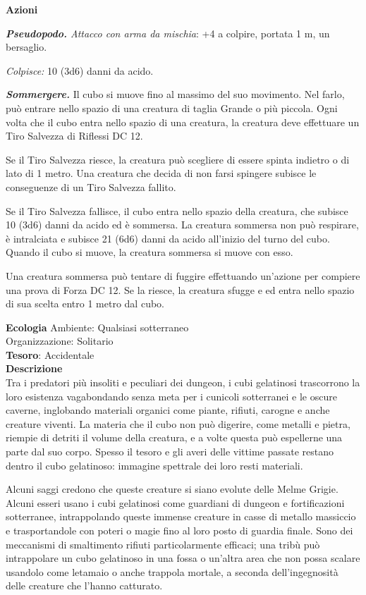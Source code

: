 \begin{multicols}{2}
\textbf{Azioni}

\textit{\textbf{Pseudopodo.} Attacco con arma da mischia}: +4 a colpire, portata 1 m, un bersaglio.

\textit{Colpisce:} 10 (3d6) danni da acido.

\textit{\textbf{Sommergere.}} Il cubo si muove fino al massimo del suo movimento. Nel farlo, può entrare nello spazio di una creatura di taglia Grande o più piccola. Ogni volta che il cubo entra nello spazio di una creatura, la creatura deve effettuare un Tiro Salvezza di Riflessi DC 12.

Se il Tiro Salvezza riesce, la creatura può scegliere di essere spinta indietro o di lato di 1 metro. Una creatura che decida di non farsi spingere subisce le conseguenze di un Tiro Salvezza fallito.

Se il Tiro Salvezza fallisce, il cubo entra nello spazio della creatura, che subisce 10 (3d6) danni da acido ed è sommersa. La creatura sommersa non può respirare, è intralciata e subisce 21 (6d6) danni da acido all'inizio del turno del cubo. Quando il cubo si muove, la creatura sommersa si muove con esso.

Una creatura sommersa può tentare di fuggire effettuando un'azione per compiere una prova di Forza DC 12. Se la riesce, la creatura sfugge e ed entra nello spazio di sua scelta entro 1 metro dal cubo.

\textbf{Ecologia}
Ambiente: Qualsiasi sotterraneo\\
Organizzazione: Solitario\\
\textbf{Tesoro}: Accidentale\\
\textbf{Descrizione}\\
Tra i predatori più insoliti e peculiari dei dungeon, i cubi gelatinosi trascorrono la loro esistenza vagabondando senza meta per i cunicoli sotterranei e le oscure caverne, inglobando materiali organici come piante, rifiuti, carogne e anche creature viventi. La materia che il cubo non può digerire, come metalli e pietra, riempie di detriti il volume della creatura, e a volte questa può espellerne una parte dal suo corpo. Spesso il tesoro e gli averi delle vittime passate restano dentro il cubo gelatinoso: immagine spettrale dei loro resti materiali.

Alcuni saggi credono che queste creature si siano evolute delle Melme Grigie. Alcuni esseri usano i cubi gelatinosi come guardiani di dungeon e fortificazioni sotterranee, intrappolando queste immense creature in casse di metallo massiccio e trasportandole con poteri o magie fino al loro posto di guardia finale. Sono dei meccanismi di smaltimento rifiuti particolarmente efficaci; una tribù può intrappolare un cubo gelatinoso in una fossa o un'altra area che non possa scalare usandolo come letamaio o anche trappola mortale, a seconda dell'ingegnosità delle creature che l'hanno catturato.


\end{multicols}
